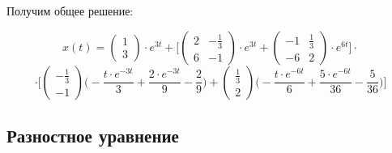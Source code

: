 Получим общее решение:

\begin{displaymath}
x(t) =
\begin{pmatrix}
1
\\
3
\end{pmatrix} \cdot e^{3t} + \Big [ \begin{pmatrix}
2 & - \frac{1}{3}
\\
6 & -1
\end{pmatrix} \cdot e^{3t} + \begin{pmatrix}
-1 & \frac{1}{3}
\\
-6 & 2
\end{pmatrix} \cdot e^{6t} \Big ] \cdot 
\end{displaymath}
\begin{displaymath}
\cdot \Big [  \begin{pmatrix}
- \frac{1}{3}
\\
- 1
\end{pmatrix} \Big ( - \frac{t \cdot e^{-3t}}{3} + \frac{2 \cdot e^{-3t}}{9} - \frac{2}{9} \Big ) + \begin{pmatrix}
\frac{1}{3}
\\
2 
\end{pmatrix} \Big ( - \frac{t \cdot e^{-6t}}{6} + \frac{5 \cdot e^{-6t}}{36} - \frac{5}{36} \Big) \Big ]
\end{displaymath}
\subsection{Разностное уравнение}


